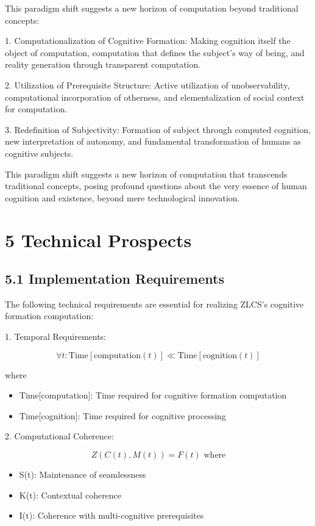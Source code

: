 \documentclass{article}
\begin{document}
This paradigm shift suggests a new horizon of computation beyond traditional concepts:

1. Computationalization of Cognitive Formation: Making cognition itself the object of computation, computation that defines the subject's way of being, and reality generation through transparent computation.

2. Utilization of Prerequisite Structure: Active utilization of unobservability, computational incorporation of otherness, and elementalization of social context for computation.

3. Redefinition of Subjectivity: Formation of subject through computed cognition, new interpretation of autonomy, and fundamental transformation of humans as cognitive subjects.

This paradigm shift suggests a new horizon of computation that transcends traditional concepts, posing profound questions about the very essence of human cognition and existence, beyond mere technological innovation.

\section{5 Technical Prospects}

\subsection{5.1 Implementation Requirements}

The following technical requirements are essential for realizing ZLCS's cognitive formation computation:

1. Temporal Requirements:

$$
\forall t : \text{Time}[\text{computation}(t)] \ll \text{Time}[\text{cognition}(t)]
$$

where
\begin{itemize}
    \item Time[computation]: Time required for cognitive formation computation
    \item Time[cognition]: Time required for cognitive processing
\end{itemize}

2. Computational Coherence:

$$
Z(C(t), M(t)) = F(t) \text{ where}
$$

\begin{itemize}
    \item S(t): Maintenance of seamlessness
    \item K(t): Contextual coherence
    \item I(t): Coherence with multi-cognitive prerequisites
\end{itemize}
\end{document}
